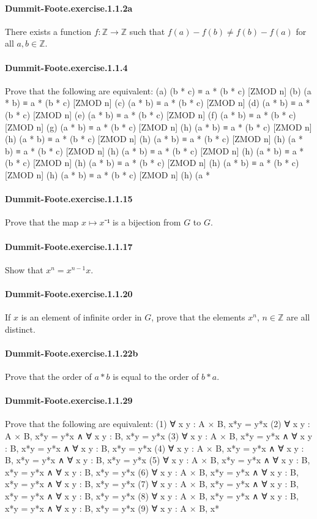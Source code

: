 \documentclass{article}
\begin{document}
\paragraph{Dummit-Foote.exercise.1.1.2a} There exists a function $f : ℤ → ℤ$ such that $f(a) - f(b) ≠ f(b) - f(a)$ for all $a, b ∈ ℤ$.

\paragraph{Dummit-Foote.exercise.1.1.4} Prove that the following are equivalent:
  (a) (b * c) ≡ a * (b * c) [ZMOD n]
  (b) (a * b) ≡ a * (b * c) [ZMOD n]
  (c) (a * b) ≡ a * (b * c) [ZMOD n]
  (d) (a * b) ≡ a * (b * c) [ZMOD n]
  (e) (a * b) ≡ a * (b * c) [ZMOD n]
  (f) (a * b) ≡ a * (b * c) [ZMOD n]
  (g) (a * b) ≡ a * (b * c) [ZMOD n]
  (h) (a * b) ≡ a * (b * c) [ZMOD n]
  (h) (a * b) ≡ a * (b * c) [ZMOD n]
  (h) (a * b) ≡ a * (b * c) [ZMOD n]
  (h) (a * b) ≡ a * (b * c) [ZMOD n]
  (h) (a * b) ≡ a * (b * c) [ZMOD n]
  (h) (a * b) ≡ a * (b * c) [ZMOD n]
  (h) (a * b) ≡ a * (b * c) [ZMOD n]
  (h) (a * b) ≡ a * (b * c) [ZMOD n]
  (h) (a * b) ≡ a * (b * c) [ZMOD n]
  (h) (a *

\paragraph{Dummit-Foote.exercise.1.1.15} Prove that the map $x \mapsto x⁻¹$ is a bijection from $G$ to $G$.

\paragraph{Dummit-Foote.exercise.1.1.17} Show that $x^n = x^{n-1} x$.

\paragraph{Dummit-Foote.exercise.1.1.20} If $x$ is an element of infinite order in $G$, prove that the elements $x^n$, $n\in\mathbb{Z}$ are all distinct.

\paragraph{Dummit-Foote.exercise.1.1.22b} Prove that the order of $a * b$ is equal to the order of $b * a$.

\paragraph{Dummit-Foote.exercise.1.1.29} Prove that the following are equivalent:
  (1) ∀ x y : A × B, x*y = y*x
  (2) ∀ x y : A × B, x*y = y*x ∧ ∀ x y : B, x*y = y*x
  (3) ∀ x y : A × B, x*y = y*x ∧ ∀ x y : B, x*y = y*x ∧ ∀ x y : B, x*y = y*x
  (4) ∀ x y : A × B, x*y = y*x ∧ ∀ x y : B, x*y = y*x ∧ ∀ x y : B, x*y = y*x
  (5) ∀ x y : A × B, x*y = y*x ∧ ∀ x y : B, x*y = y*x ∧ ∀ x y : B, x*y = y*x
  (6) ∀ x y : A × B, x*y = y*x ∧ ∀ x y : B, x*y = y*x ∧ ∀ x y : B, x*y = y*x
  (7) ∀ x y : A × B, x*y = y*x ∧ ∀ x y : B, x*y = y*x ∧ ∀ x y : B, x*y = y*x
  (8) ∀ x y : A × B, x*y = y*x ∧ ∀ x y : B, x*y = y*x ∧ ∀ x y : B, x*y = y*x
  (9) ∀ x y : A × B, x*
\end{document}
